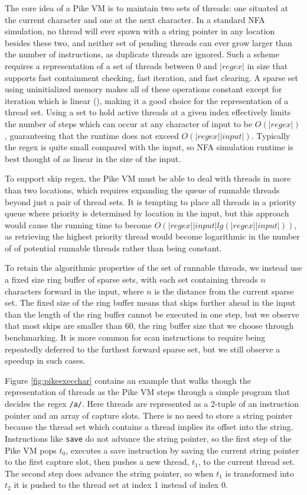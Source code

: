 The core idea of a Pike VM is to maintain two sets of threads:
one situated at the current character and one at the next character.
In a standard NFA simulation, no thread will ever spawn with
a string pointer in any location besides these two, and
neither set of pending threads can ever grow larger than
the number of instructions, as duplicate threads are ignored.
Such a scheme requires a representation of a set of threads
between $0$ and $|regex|$ in size that supports fast containment
checking, fast iteration, and fast clearing. A sparse set using
uninitialized memory makes all of these operations constant except
for iteration which is linear (\cite{Briggs1993}), making it
a good choice for the representation of a thread set. Using
a set to hold active threads at a given index
effectively limits the number of steps which can occur
at any character of input to be $O(|regex|)$, guaranteeing that
the runtime does not exceed $O(|regex||input|)$. Typically the regex
is quite small compared with the input, so NFA simulation runtime is best
thought of as linear in the size of the input.

To support skip regex, the Pike VM must be able to deal
with threads in more than two locations, which requires expanding
the queue of runnable threads beyond just a pair of thread sets.
It is tempting to place all threads in a priority queue where
priority is determined by location in the input,
but this approach would cause the running time to become
$O(|regex||input|lg(|regex||input|))$, as retrieving the highest
priority thread would become logarithmic in the number of
of potential runnable threads rather than being constant.

To retain the algorithmic properties of the set of runnable threads,
we instead use a fixed size ring buffer of sparse sets, with
each set containing threads $n$ characters forward in the input,
where $n$ is the distance from the current sparse set. The fixed
size of the ring buffer means
that skips further ahead in the input than the length of the ring
buffer cannot be executed in one step, but we observe that most
skips are smaller than $60$, the ring buffer size that we choose
through benchmarking. It is more common for scan instructions to
require being repeatedly deferred to the furthest forward sparse set,
but we still observe a speedup in such cases.

Figure \ref{fig:pikeexecchar} contains an example that walks though
the representation of threads as the Pike VM steps through a simple
program that decides the regex \verb'/a/'. Here threads are represented as
a 2-tuple of an instruction pointer and an array of capture slots.
There is no need to store a string pointer because the thread set
which contains a thread implies its offset into the string.
Instructions like \verb'save' do not advance the string pointer,
so the first step of the Pike VM pops $t_0$, executes a save instruction
by saving the current string pointer to the first capture slot, then
pushes a new thread, $t_1$, to the current thread set. The second step
does advance the string pointer, so when $t_1$ is transformed into $t_2$
it is pushed to the thread set at index 1 instead of index 0.

